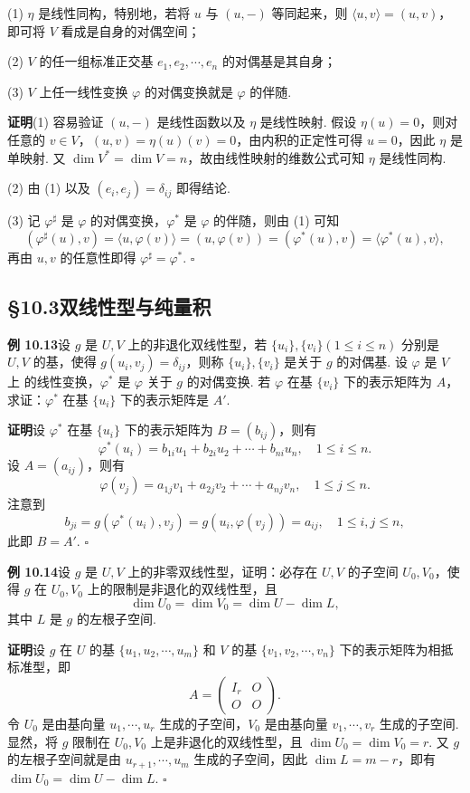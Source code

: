 \documentclass[UTF8,12pt,a4paper,fontset=fandol]{ctexart}
\begin{document}
(1) $\eta$ 是线性同构，特别地，若将 $u$ 与 $(u,-)$ 等同起来，则 $\langle u,v\rangle=(u,v)$，即可将 $V$ 看成是自身的对偶空间；

(2) $V$ 的任一组标准正交基 $e_1,e_2,\cdots,e_n$ 的对偶基是其自身；

(3) $V$ 上任一线性变换 $\varphi$ 的对偶变换就是 $\varphi$ 的伴随.

\noindent\textbf{证明}\quad (1) 容易验证 $(u,-)$ 是线性函数以及 $\eta$ 是线性映射. 假设 $\eta(u)=0$，则对任意的 $v\in V$，$(u,v)=\eta(u)(v)=0$，由内积的正定性可得 $u=0$，因此 $\eta$ 是单映射. 又 $\dim V^*=\dim V=n$，故由线性映射的维数公式可知 $\eta$ 是线性同构.

(2) 由 (1) 以及 $(e_i,e_j)=\delta_{ij}$ 即得结论.

(3) 记 $\varphi^\sharp$ 是 $\varphi$ 的对偶变换，$\varphi^*$ 是 $\varphi$ 的伴随，则由 (1) 可知
\[
(\varphi^\sharp(u),v)=\langle u,\varphi(v)\rangle=(u,\varphi(v))=(\varphi^*(u),v)=\langle\varphi^*(u),v\rangle,
\]
再由 $u,v$ 的任意性即得 $\varphi^\sharp=\varphi^*$. $\square$

\subsection*{§10.3\quad 双线性型与纯量积}

\noindent\textbf{例 10.13}\quad 设 $g$ 是 $U,V$ 上的非退化双线性型，若 $\{u_i\},\{v_i\}(1\le i\le n)$ 分别是 $U,V$ 的基，使得 $g(u_i,v_j)=\delta_{ij}$，则称 $\{u_i\},\{v_i\}$ 是关于 $g$ 的对偶基. 设 $\varphi$ 是 $V$ 上
的线性变换，$\varphi^*$ 是 $\varphi$ 关于 $g$ 的对偶变换. 若 $\varphi$ 在基 $\{v_i\}$ 下的表示矩阵为 $A$，求证：$\varphi^*$ 在基 $\{u_i\}$ 下的表示矩阵是 $A'$.

\noindent\textbf{证明}\quad 设 $\varphi^*$ 在基 $\{u_i\}$ 下的表示矩阵为 $B=(b_{ij})$，则有
\[
\varphi^*(u_i)=b_{1i}u_1+b_{2i}u_2+\cdots+b_{ni}u_n,\quad 1\le i\le n.
\]
设 $A=(a_{ij})$，则有
\[
\varphi(v_j)=a_{1j}v_1+a_{2j}v_2+\cdots+a_{nj}v_n,\quad 1\le j\le n.
\]
注意到
\[
b_{ji}=g(\varphi^*(u_i),v_j)=g(u_i,\varphi(v_j))=a_{ij},\quad 1\le i,j\le n,
\]
此即 $B=A'$. $\square$

\noindent\textbf{例 10.14}\quad 设 $g$ 是 $U,V$ 上的非零双线性型，证明：必存在 $U,V$ 的子空间 $U_0,V_0$，使得 $g$ 在 $U_0,V_0$ 上的限制是非退化的双线性型，且
\[
\dim U_0=\dim V_0=\dim U-\dim L,
\]
其中 $L$ 是 $g$ 的左根子空间.

\noindent\textbf{证明}\quad 设 $g$ 在 $U$ 的基 $\{u_1,u_2,\cdots,u_m\}$ 和 $V$ 的基 $\{v_1,v_2,\cdots,v_n\}$ 下的表示矩阵为相抵标准型，即
\[
A=\left(\begin{array}{cc}
I_r & O\\
O & O
\end{array}\right).
\]
令 $U_0$ 是由基向量 $u_1,\cdots,u_r$ 生成的子空间，$V_0$ 是由基向量 $v_1,\cdots,v_r$ 生成的子空间. 显然，将 $g$ 限制在 $U_0,V_0$ 上是非退化的双线性型，且 $\dim U_0=\dim V_0=r$. 又 $g$ 的左根子空间就是由 $u_{r+1},\cdots,u_m$ 生成的子空间，因此 $\dim L=m-r$，即有 $\dim U_0=\dim U-\dim L$. $\square$
\end{document}
